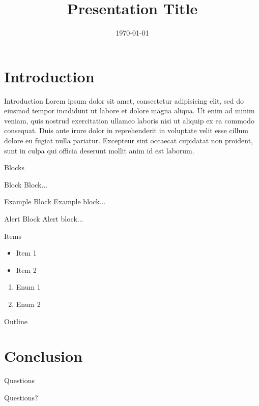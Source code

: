 \documentclass{beamer}
\title[Presentation]{Presentation Title}
\author[Dogan]
{%
  \texorpdfstring{
    \begin{columns}
      \column{.45\linewidth}
      \centering
      Haluk Dogan\\
      \url{https://haluk.github.io/}\\
      \href{mailto:hlk.dogan@gmail.com}{hlk.dogan@gmail.com}
    \end{columns}
}
{Dogan}
}
\institute[UNL] %
{
  Department of Computer Science\\
  University of Nebraska-Lincoln
}
\date[\today] %
{\today}
\begin{document}
\begin{frame}\titlepage
\end{frame}

\section{Introduction}
\begin{frame}{Introduction}
  Lorem ipsum dolor sit amet, consectetur adipisicing elit, sed do
  eiusmod tempor incididunt ut labore et dolore magna aliqua. Ut
  enim ad minim veniam, quis nostrud exercitation ullamco laboris
  nisi ut aliquip ex ea commodo consequat. Duis aute irure dolor in
  reprehenderit in voluptate velit esse cillum dolore eu fugiat
  nulla pariatur. Excepteur sint occaecat cupidatat non proident,
  sunt in culpa qui officia deserunt mollit anim id est laborum.
\end{frame}

\begin{frame}{Blocks}
  \begin{block}{Block}
    Block...
  \end{block}
  \begin{exampleblock}{Example Block}
    Example block...
  \end{exampleblock}
  \begin{alertblock}{Alert Block}
    Alert block...
  \end{alertblock}
\end{frame}

\begin{frame}{Items}
  \begin{itemize}
  \item Item 1
  \item Item 2
  \end{itemize}

  \begin{enumerate}
  \item Enum 1
  \item Enum 2
  \end{enumerate}
\end{frame}

\begin{frame}{Outline}
  \tableofcontents
\end{frame}

\section{Conclusion}
\begin{frame}{Questions}
  \begin{center}
    \Huge{Questions?}
  \end{center}
\end{frame}
\end{document}
